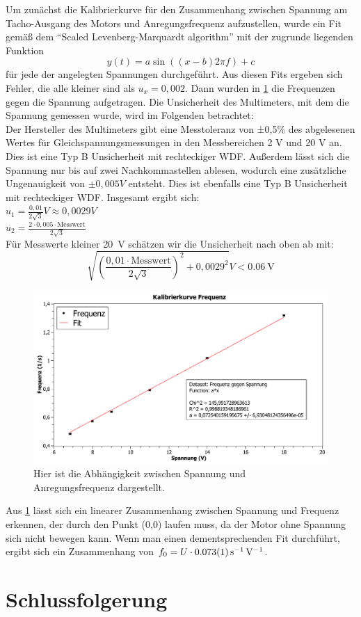\documentclass[
	a4paper,
	12pt,
	pagesize,
	ngerman
]{scrartcl}
\begin{document}
	Um zunächst die Kalibrierkurve für den Zusammenhang zwischen Spannung am Tacho-Ausgang des Motors und Anregungsfrequenz aufzustellen, wurde ein Fit gemäß dem \enquote{Scaled Levenberg-Marquardt algorithm} mit der zugrunde liegenden Funktion
	\begin{equation}
	y(t) = a \sin ((x-b)2 \pi f) + c
	\end{equation}
	für jede der angelegten Spannungen durchgeführt. Aus diesen Fits ergeben sich Fehler, die alle kleiner sind als $ u_x = 0,002 $. Dann wurden in \cref{Kalibirierkurve} die Frequenzen gegen die Spannung aufgetragen. Die Unsicherheit des Multimeters, mit dem die Spannung gemessen wurde, wird im Folgenden betrachtet: \\
	Der Hersteller des Multimeters gibt eine Messtoleranz von ±0,5\% des abgelesenen Wertes für Gleichspannungsmessungen in den Messbereichen 2 V und 20 V an. Dies ist eine Typ B Unsicherheit mit rechteckiger WDF. Außerdem lässt sich die Spannung nur bis auf zwei Nachkommastellen ablesen, wodurch eine zusätzliche Ungenauigkeit von $\pm 0,005\si{V}$ entsteht. Dies ist ebenfalls eine Typ B Unsicherheit mit rechteckiger WDF. Insgesamt ergibt sich: \\
	$u_1= \frac{0,01}{2\sqrt{3}} \si{V} \approx 0,0029 \si{V}$ \\
	$u_2= \frac{2 \cdot 0,005 \cdot \text{Messwert}}{2 \sqrt{3}}$ \\ %
	Für Messwerte kleiner \SI{20}{\volt} schätzen wir die Unsicherheit nach oben ab mit:
	\begin{equation*}
		\sqrt{(\frac{0,01 \cdot \text{Messwert}}{2 \sqrt{3}})^2 + 0,0029^2} \si{V} <  \SI{0,06}{\volt}
	\end{equation*}
	
	\begin{figure}[htb]
		\includegraphics[width=1\textwidth]{Kalibrierkurve_Graph}
		\centering
		\caption{Hier ist die Abhängigkeit zwischen Spannung und Anregungsfrequenz dargestellt.}
		\label{Kalibirierkurve}
		\centering
	\end{figure}
	Aus \cref{Kalibirierkurve} lässt sich ein linearer Zusammenhang zwischen Spannung und Frequenz erkennen, der durch den Punkt (0,0) laufen muss, da der Motor ohne Spannung sich nicht bewegen kann. Wenn man einen dementsprechenden Fit durchführt, ergibt sich ein Zusammenhang von $ f_0 = U \cdot \SI{0,073 \pm 0,001}{\per \second \per \volt} $.
	
	
	\section{Schlussfolgerung}
	
\end{document}
